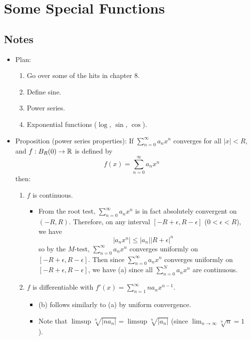 \documentclass[../notes.tex]{subfiles}
\begin{document}
\chapter{Some Special Functions}
\section{Notes}
\begin{itemize}
    \item {}Plan:
    \begin{enumerate}
        \item Go over some of the hits in chapter 8.
        \item Define sine.
        \item Power series.
        \item Exponential functions ($\log$, $\sin$, $\cos$).
    \end{enumerate}
    \item Proposition (power series properties): If $\sum_{n=0}^\infty a_nx^n$ converges for all $|x|<R$, and $f:B_R(0)\to\mathbb{R}$ is defined by
    \begin{equation*}
        f(x) = \sum_{n=0}^\infty a_nx^n
    \end{equation*}
    then:
    \begin{enumerate}[label={(\alph*)}]
        \item $f$ is continuous.
        \begin{itemize}
            \item From the root test, $\sum_{n=0}^\infty a_nx^n$ is in fact absolutely convergent on $(-R,R)$. Therefore, on any interval $[-R+\epsilon,R-\epsilon]$ ($0<\epsilon<R$), we have
            \begin{equation*}
                |a_nx^n| \leq |a_n||R+\epsilon|^n
            \end{equation*}
            so by the $M$-test, $\sum_{n=0}^\infty a_nx^n$ converges uniformly on $[-R+\epsilon,R-\epsilon]$. Then since $\sum_{n=0}^\infty a_nx^n$ converges uniformly on $[-R+\epsilon,R-\epsilon]$, we have (a) since all $\sum_{n=0}^Na_nx^n$ are continuous.
        \end{itemize}
        \item $f$ is differentiable with $f'(x)=\sum_{n=1}^\infty na_nx^{n-1}$.
        \begin{itemize}
            \item (b) follows similarly to (a) by uniform convergence.
            \item Note that $\limsup\sqrt[n]{|na_n|}=\limsup\sqrt[n]{|a_n|}$ (since $\lim_{n\to\infty}\sqrt[n]{n}=1$).

\end{itemize}
\end{enumerate}
\end{itemize}
\end{document}
